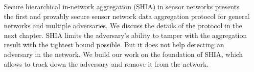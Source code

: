 
	Secure hierarchical in-network aggregation (SHIA) in sensor networks \cite{chan2006secure} presents the first and provably secure sensor network data aggregation protocol for general networks and multiple adversaries. 
	We discuss the details of the protocol in the next chapter. 
	SHIA limits the adversary's ability to tamper with the aggregation result with the tightest bound possible.
	But it does not help detecting an adversary in the network.
	We build our work on the foundation of SHIA, which allows to track down the adversary and remove it from the network.